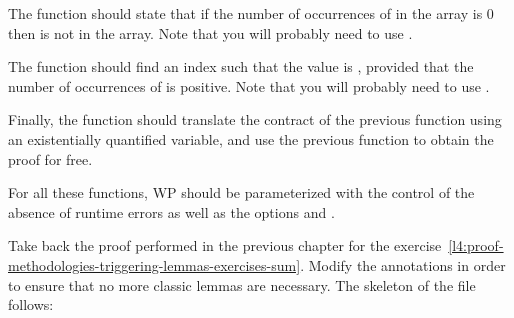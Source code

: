 The function  should state that if the number of
occurrences of  in the array is 0 then  is not in
the array. Note that you will probably need to use .


The function  should find an index 
such that the value  is , provided that the
number of occurrences of  is positive. Note that you will
probably need to use .


Finally, the function  should translate the contract
of the previous function using an existentially quantified variable, and use the
previous function to obtain the proof for free.


For all these functions, WP should be parameterized with the control of the
absence of runtime errors as well as the options
 and .




Take back the proof performed in the previous chapter for the
exercise~\ref{l4:proof-methodologies-triggering-lemmas-exercises-sum}. Modify
the annotations in order to ensure that no more classic lemmas are necessary.
The skeleton of the file follows:



